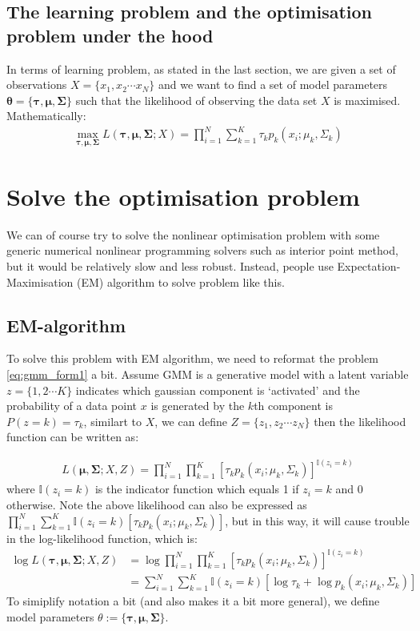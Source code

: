 \documentclass{article} [10pt] %
\newcommand{\bs}{\boldsymbol}
\begin{document}
\subsection{The learning problem and the optimisation problem under the hood}
In terms of learning problem, as stated in the last section, we are given a set of observations $X=\{x_1, x_2\cdots x_N\}$ and we want to find a set of model parameters $\boldsymbol\theta=\{\boldsymbol\tau, \boldsymbol\mu, \boldsymbol\Sigma\}$ such that the likelihood of observing the data set $X$ is maximised. Mathematically:
\begin{align}
	\max_{\boldsymbol\tau, \boldsymbol\mu, \boldsymbol\Sigma} L(\boldsymbol\tau, \boldsymbol\mu, \boldsymbol\Sigma;X) = \prod_{i=1}^N \sum_{k=1}^K \tau_k p_k(x_i; \mu_k, \Sigma_k)
\end{align}

\section{Solve the optimisation problem}
We can of course try to solve the nonlinear optimisation problem with some generic numerical nonlinear programming solvers such as interior point method, but it would be relatively slow and less robust. Instead, people use Expectation-Maximisation (EM) algorithm to solve problem like this.

\subsection{EM-algorithm}
To solve this problem with EM algorithm, we need to reformat the problem \eqref{eq:gmm_form1} a bit. Assume GMM is a generative model with a latent variable $z=\{1, 2\cdots K\}$ indicates which gaussian component is `activated' and the probability of a data point $x$ is generated by the $k$th component is $P(z=k)=\tau_k$, similart to $X$, we can define $Z=\{z_1, z_2\cdots z_N\}$ then the likelihood function can be written as:

\begin{align} \label{eq:complete_log_likelihood}
	 L(\bs\mu, \bs\Sigma;X, Z) = \prod_{i=1}^N \prod_{k=1}^K \left[\tau_k p_k(x_i; \mu_k, \Sigma_k)\right]^{\mathbb{I}(z_i=k)}
\end{align}
where $\mathbb{I}(z_i=k)$ is the indicator function which equals 1 if $z_i=k$ and 0 otherwise. Note the above likelihood can also be expressed as $ \prod_{i=1}^N \sum_{k=1}^K \mathbb{I}(z_i=k)\left[\tau_k p_k(x_i; \mu_k, \Sigma_k)\right]$, but in this way, it will cause trouble in the log-likelihood function, which is:
\begin{align}
	\log L(\bs\tau, \bs\mu, \bs\Sigma;X, Z) &= \log\prod_{i=1}^N \prod_{k=1}^K \left[\tau_k p_k(x_i; \mu_k, \Sigma_k)\right]^{\mathbb{I}(z_i=k)}\\
		&= \sum_{i=1}^N \sum_{k=1}^K \mathbb{I}(z_i=k)\left[\log\tau_k + \log p_k(x_i; \mu_k, \Sigma_k)\right]
\end{align}
To simiplify notation a bit (and also makes it a bit more general), we define model parameters $\theta:=\{\bs\tau, \bs\mu, \bs\Sigma\}$.
\end{document}
